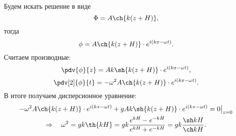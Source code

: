 Будем искать решение в виде
\begin{equation}
	\Phi=A\ch{k(z+H)},
\end{equation}
тогда
\begin{equation}
	\phi=A\ch{k(z+H)}\cdot e^{i(kx- \omega t)}.
\end{equation}
Считаем производные:
\begin{equation}
	\pdv{\phi}{z}=Ak\sh{k(z+H)}\cdot e^{i(kx- \omega t)},
\end{equation}
\begin{equation}
	\pdv[2]{\phi}{t}=-\omega^2A\ch{k(z+H)}\cdot e^{i(kx- \omega t)}.
\end{equation}
В итоге получаем дисперсионное уравнение:
\begin{multline}
	\label{eq:disp}
	-\omega^2A\ch{k(z+H)}\cdot e^{i(kx- \omega t)}+gAk\sh{k(z+H)}\cdot e^{i(kx- \omega t)}=0 \big|_{z=0}
	\\ \Rightarrow \quad
	\omega^2=gk\th{kH} = gk \frac{e^{kH}-e^{-kH}}{e^{kH}+e^{-kH}} = gk\frac{\sh kH}{\ch kH}.
\end{multline}






